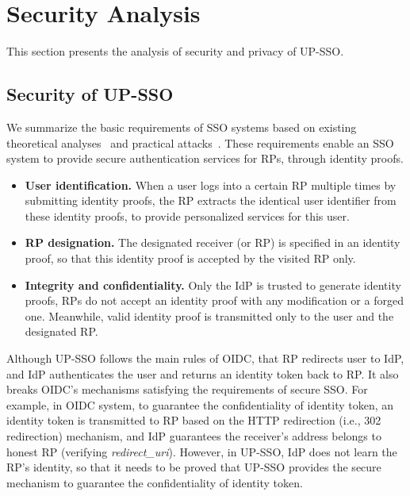 \section{Security Analysis}
\label{sec:analysis}
This section presents the analysis of security and privacy of UP-SSO. 

\subsection{Security of UP-SSO}
We summarize the basic requirements of SSO systems based on existing theoretical analyses~\cite{ArmandoCCCT08,FettKS16, FettKS17} and practical attacks~\cite{SomorovskyMSKJ12,WangCW12,ArmandoCCCPS13,ZhouE14,WangZLLYLG15,WangZLG16,YangLLZH16,MainkaMS16,MohsenS16,MainkaMSW17,YangLCZ18,YangLS17,ShiWL19}. These requirements enable an SSO system to provide secure authentication services for RPs,
    through identity proofs.
\begin{itemize}
\item
\textbf{User identification.} When a user logs into a certain RP multiple times by submitting identity proofs,
 the RP extracts the identical user identifier from these identity proofs,
    to provide personalized services for this user.

\item
\textbf{RP designation.} The designated receiver (or RP) is specified in an identity proof,
    so that this identity proof is accepted by the visited RP only.

\item
\textbf{Integrity and confidentiality.}
 Only the IdP is trusted to generate identity proofs,
 RPs do not accept an identity proof with any modification or a forged one.
Meanwhile, valid identity proof is transmitted only to the user and the designated RP.
\end{itemize}

Although UP-SSO follows the main rules of OIDC, that RP redirects user to IdP, and IdP authenticates the user and returns an identity token back to RP. It also breaks OIDC's mechanisms satisfying the requirements of secure SSO. For example, in OIDC system, to guarantee the confidentiality of identity token, an identity token is transmitted to RP based on the HTTP redirection (i.e., 302 redirection) mechanism, and IdP guarantees the receiver's address belongs to honest RP (verifying \emph{redirect\_uri}). However, in UP-SSO, IdP does not learn the RP's identity, so that it needs to be proved that UP-SSO provides the secure mechanism to guarantee the confidentiality of identity token.

